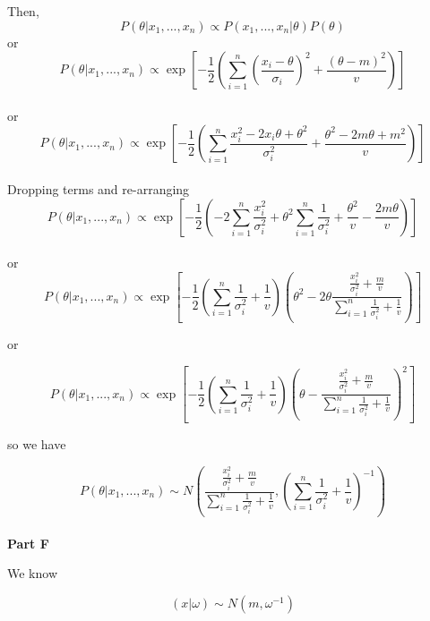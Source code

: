 \documentclass[12pt]{amsart}
\begin{document}
Then,\\

$$P( \theta|x_1, ..., x_n ) \propto P( x_1, ..., x_n|\theta)P(\theta)$$
 or\\
 
 $$P( \theta|x_1, ..., x_n ) \propto \exp\left[-\frac{1}{2} \left(\sum_{i=1}^{n}\left(\frac{x_i-\theta}{\sigma_i}\right)^2 + \frac{(\theta-m)^2}{v}\right)\right] $$\\
 
 or \\
 
  $$P( \theta|x_1, ..., x_n ) \propto \exp\left[-\frac{1}{2} \left(\sum_{i=1}^{n}\frac{x_i^2 - 2x_i\theta+\theta^2}{\sigma_i^2} + \frac{\theta^2-2m\theta + m^2}{v}\right)\right] $$\\
  
  Dropping terms and re-arranging\\
  
    $$P( \theta|x_1, ..., x_n ) \propto \exp\left[-\frac{1}{2} \left( -2\sum_{i=1}^{n}\frac{x_i^2}{\sigma_i^2} + \theta^2\sum_{i=1}^{n}\frac{1}{\sigma_i^2} +\frac{\theta^2}{v} -\frac{2m\theta}{v}\right) \right] $$\\
    
    
    or\\
    
        $$P( \theta|x_1, ..., x_n ) \propto \exp\left[-\frac{1}{2}\left( \sum_{i=1}^{n}\frac{1}{\sigma_i^2} + \frac{1}{v} \right) \left(
        \theta^2 -2\theta \frac{\frac{x_i^2}{\sigma_i^2}+\frac{m}{v} }{\sum_{i=1}^{n}\frac{1}{\sigma_i^2} + \frac{1}{v}}   \right)\right]$$
        
        
or 

  $$P( \theta|x_1, ..., x_n ) \propto \exp\left[-\frac{1}{2}\left( \sum_{i=1}^{n}\frac{1}{\sigma_i^2} + \frac{1}{v} \right) \left(
        \theta - \frac{\frac{x_i^2}{\sigma_i^2}+\frac{m}{v} }{\sum_{i=1}^{n}\frac{1}{\sigma_i^2} + \frac{1}{v}}   \right)^2\right]$$
        
so we have


$$P( \theta|x_1, ..., x_n ) \sim   N \left(\frac{\frac{x_i^2}{\sigma_i^2}+\frac{m}{v} }{\sum_{i=1}^{n}\frac{1}{\sigma_i^2} + \frac{1}{v}}, \left( \sum_{i=1}^{n}\frac{1}{\sigma_i^2} + \frac{1}{v} \right)^{-1}  \right)$$\\

{\bf Part F} \\
\bigskip
    
    
We know

$$ (x|\omega) \sim N(m, \omega^{-1})$$\\
\end{document}
